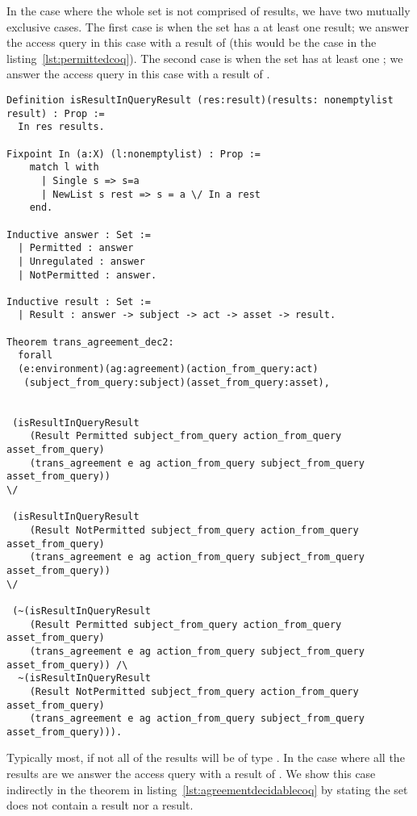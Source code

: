 In the case where the whole set is not comprised of  results, we have two mutually exclusive cases. The first case is when the set has a at least one  result; we answer the access query in this case with a result of  (this would be the case in the listing~\ref{lst:permittedcoq}). The second case is when the set has at least one ; we answer the access query in this case with a result of . 


\begin{minipage}[c]{0.95\textwidth}
\begin{lstlisting}
Definition isResultInQueryResult (res:result)(results: nonemptylist result) : Prop :=
  In res results.

Fixpoint In (a:X) (l:nonemptylist) : Prop :=
    match l with
      | Single s => s=a
      | NewList s rest => s = a \/ In a rest
    end.

Inductive answer : Set :=
  | Permitted : answer
  | Unregulated : answer
  | NotPermitted : answer.

Inductive result : Set :=
  | Result : answer -> subject -> act -> asset -> result.

Theorem trans_agreement_dec2:
  forall
  (e:environment)(ag:agreement)(action_from_query:act)
   (subject_from_query:subject)(asset_from_query:asset),


 (isResultInQueryResult 
    (Result Permitted subject_from_query action_from_query asset_from_query)
    (trans_agreement e ag action_from_query subject_from_query asset_from_query)) 
\/

 (isResultInQueryResult 
    (Result NotPermitted subject_from_query action_from_query asset_from_query)
    (trans_agreement e ag action_from_query subject_from_query asset_from_query))
\/

 (~(isResultInQueryResult 
    (Result Permitted subject_from_query action_from_query asset_from_query)
    (trans_agreement e ag action_from_query subject_from_query asset_from_query)) /\
  ~(isResultInQueryResult 
    (Result NotPermitted subject_from_query action_from_query asset_from_query)
    (trans_agreement e ag action_from_query subject_from_query asset_from_query))).

\end{lstlisting}
\end{minipage}

Typically most, if not all of the results will be of type . In the case where all the results are  we answer the access query with a result of . We show this case indirectly in the theorem in listing~\ref{lst:agreementdecidablecoq} by stating the set does not contain a  result nor a  result. 

